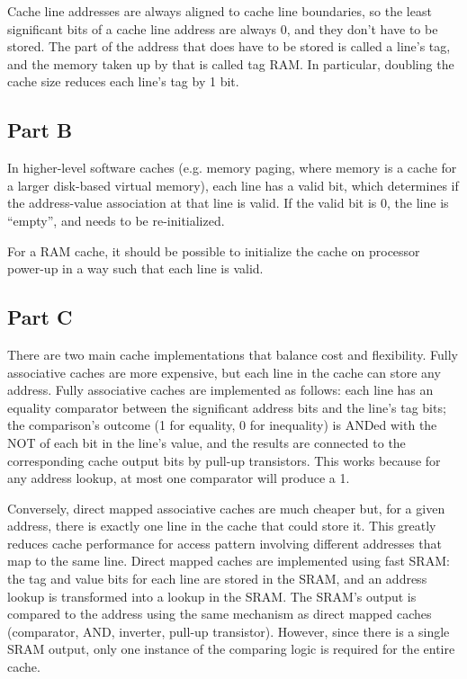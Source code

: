 Cache line addresses are always aligned to cache line boundaries, so the least
significant bits of a cache line address are always 0, and they don't have to
be stored. The part of the address that does have to be stored is called a
line's tag, and the memory taken up by that is called tag RAM. In particular,
doubling the cache size reduces each line's tag by 1 bit.

\subsection{Part B}
In higher-level software caches (e.g. memory paging, where memory is a cache
for a larger disk-based virtual memory), each line has a valid bit, which
determines if the address-value association at that line is valid. If the valid
bit is 0, the line is ``empty'', and needs to be re-initialized.

For a RAM cache, it should be possible to initialize the cache on processor
power-up in a way such that each line is valid.

\subsection{Part C}
There are two main cache implementations that balance cost and flexibility.
Fully associative caches are more expensive, but each line in the cache can
store any address. Fully associative caches are implemented as follows: each
line has an equality comparator between the significant address bits and the
line's tag bits; the comparison's outcome (1 for equality, 0 for inequality) is
ANDed with the NOT of each bit in the line's value, and the results are
connected to the corresponding cache output bits by pull-up transistors. This
works because for any address lookup, at most one comparator will produce a 1.

Conversely, direct mapped associative caches are much cheaper but, for a
given address, there is exactly one line in the cache that could store it. This
greatly reduces cache performance for access pattern involving different
addresses that map to the same line. Direct mapped caches are implemented using
fast SRAM: the tag and value bits for each line are stored in the SRAM, and an
address lookup is transformed into a lookup in the SRAM. The SRAM's output is
compared to the address using the same mechanism as direct mapped caches
(comparator, AND, inverter, pull-up transistor). However, since there is a
single SRAM output, only one instance of the comparing logic is required for
the entire cache.

